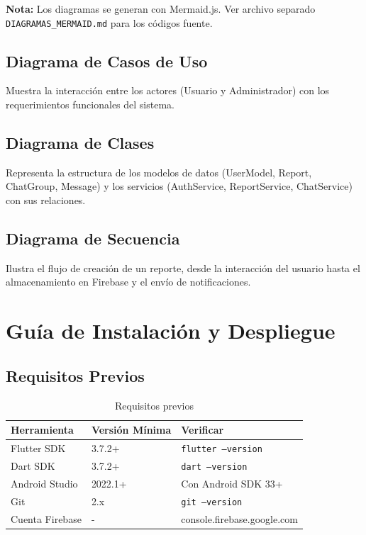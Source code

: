 \documentclass[12pt,a4paper]{article}
\begin{document}
\textbf{Nota:} Los diagramas se generan con Mermaid.js. Ver archivo separado \texttt{DIAGRAMAS\_MERMAID.md} para los códigos fuente.

\subsection{Diagrama de Casos de Uso}
Muestra la interacción entre los actores (Usuario y Administrador) con los requerimientos funcionales del sistema.

\subsection{Diagrama de Clases}
Representa la estructura de los modelos de datos (UserModel, Report, ChatGroup, Message) y los servicios (AuthService, ReportService, ChatService) con sus relaciones.

\subsection{Diagrama de Secuencia}
Ilustra el flujo de creación de un reporte, desde la interacción del usuario hasta el almacenamiento en Firebase y el envío de notificaciones.


\section{Guía de Instalación y Despliegue}

\subsection{Requisitos Previos}

\begin{table}[h]
\centering
\begin{tabular}{|l|l|l|}
\hline
\textbf{Herramienta} & \textbf{Versión Mínima} & \textbf{Verificar} \\
\hline
Flutter SDK & 3.7.2+ & \texttt{flutter --version} \\
Dart SDK & 3.7.2+ & \texttt{dart --version} \\
Android Studio & 2022.1+ & Con Android SDK 33+ \\
Git & 2.x & \texttt{git --version} \\
Cuenta Firebase & - & console.firebase.google.com \\
\hline
\end{tabular}
\caption{Requisitos previos}
\end{table}
\end{document}
